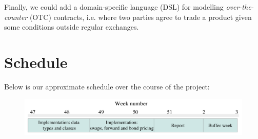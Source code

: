 \documentclass[11pt]{article}
\begin{document}
Finally, we could add a domain-specific language (DSL) for modelling \emph{over-the-counter}
(OTC) contracts, i.e. where two parties agree to trade a product given some conditions
outside regular exchanges.

\section*{Schedule}


Below is our approximate schedule over the course of the project:

\begin{figure}[h!]
\begin{center}
\includegraphics[bb = 0 0 1302 348, scale=0.275]{schedule.png}
\end{center}
\end{figure}



\end{document}
